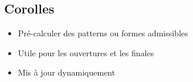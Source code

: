 	\subsection{Corolles}
	\begin{frame}
		\begin{itemize}[<+->]
			\item Pré-calculer des patterns ou formes admissibles
			\item Utile pour les ouvertures et les finales
			\item Mis à jour dynamiquement
		\end{itemize}
		\begin{minipage}{0.47\textwidth}
			\begin{figure}

\end{figure}
\end{minipage}
\end{frame}

